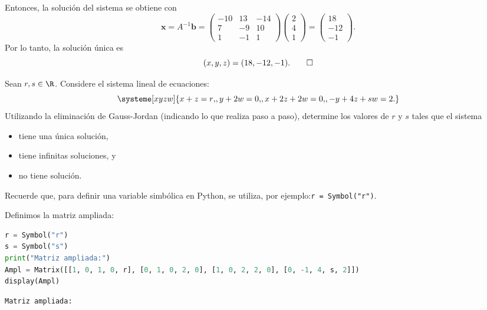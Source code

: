 \documentclass[12pt,a4]{aleph-examen}
\begin{document}
\begin{preguntas}
\begin{respuesta}
    Entonces, la solución del sistema se obtiene con
    \[
        \mathbf{x}=A^{-1}\mathbf{b}
        =\begin{pmatrix}
            -10 & 13 & -14\\
            7 & -9 & 10\\
            1 & -1 & 1
        \end{pmatrix}
        \begin{pmatrix}
            2\\4\\1
        \end{pmatrix}
        =\begin{pmatrix}
            18\\-12\\-1
        \end{pmatrix}.
    \]
    Por lo tanto, la solución única es
    \[
        (x,y,z)=(18,-12,-1).\qedhere
    \]
\end{respuesta}

\item Sean $r,s \in \R$. Considere el sistema lineal de ecuaciones:
    \[
        \systeme[xyzw]{x + z = r{,}, 
        y + 2w = 0{,}, 
        x + 2z + 2w = 0{,}, 
        -y + 4z + sw =2{.}}
    \]
    Utilizando la eliminación de Gauss-Jordan (indicando lo que realiza paso a paso), determine los valores de $r$ y $s$ tales que el sistema
    \begin{itemize}
        \item tiene una única solución,
        \item tiene infinitas soluciones, y
        \item no tiene solución.
    \end{itemize}
    Recuerde que, para definir una variable simbólica en Python, se utiliza, por ejemplo:\linebreak \verb+r = Symbol("r")+.

\begin{respuesta}
    Definimos la matriz ampliada:
\begin{pycodigo}
    \begin{ipynbcodigo}\begin{lstlisting}[language=Python]
r = Symbol("r")
s = Symbol("s")
print("Matriz ampliada:")
Ampl = Matrix([[1, 0, 1, 0, r], [0, 1, 0, 2, 0], [1, 0, 2, 2, 0], [0, -1, 4, s, 2]])
display(Ampl)
    \end{lstlisting}\end{ipynbcodigo}
    \begin{ipynbsalida}[2mm]
    \begin{Verbatim}[commandchars=\\\{\}]
Matriz ampliada:
    \end{Verbatim}


\end{ipynbsalida}
\end{pycodigo}
\end{respuesta}
\end{preguntas}
\end{document}
